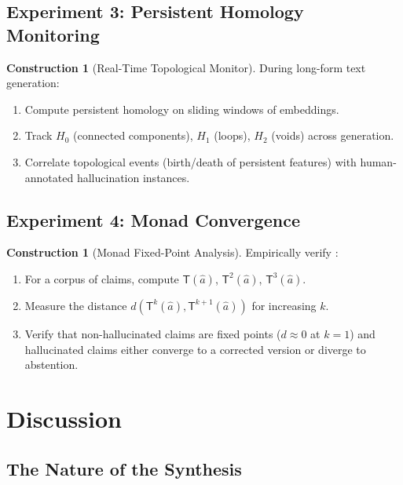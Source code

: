 \documentclass[11pt,a4paper]{article}
\theoremstyle{plain}
\theoremstyle{definition}
\newtheorem{construction}[theorem]{Construction}
\theoremstyle{remark}
\newcommand{\SemanticT}{\mathsf{T}}
\begin{document}
\subsection{Experiment 3: Persistent Homology Monitoring}

\begin{construction}[Real-Time Topological Monitor]\label{con:monitor-eval}
During long-form text generation:
\begin{enumerate}[nosep]
  \item Compute persistent homology on sliding windows of embeddings.
  \item Track $H_0$ (connected components), $H_1$ (loops), $H_2$ (voids) across generation.
  \item Correlate topological events (birth/death of persistent features) with human-annotated hallucination instances.
\end{enumerate}
\end{construction}

\subsection{Experiment 4: Monad Convergence}

\begin{construction}[Monad Fixed-Point Analysis]\label{con:monad-convergence}
Empirically verify :
\begin{enumerate}[nosep]
  \item For a corpus of claims, compute $\SemanticT(\hat{a})$, $\SemanticT^2(\hat{a})$, $\SemanticT^3(\hat{a})$.
  \item Measure the distance $d(\SemanticT^k(\hat{a}), \SemanticT^{k+1}(\hat{a}))$ for increasing $k$.
  \item Verify that non-hallucinated claims are fixed points ($d \approx 0$ at $k = 1$) and hallucinated claims either converge to a corrected version or diverge to abstention.
\end{enumerate}
\end{construction}


\section{Discussion}\label{sec:discussion}

\subsection{The Nature of the Synthesis}
\end{document}
